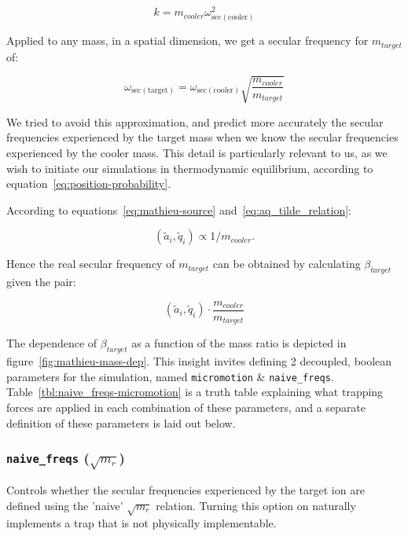 \begin{equation}
k = m_{cooler} \omega_{\mathrm{sec(cooler)}}^2
\end{equation}

Applied to any mass, in a spatial dimension, we get a secular frequency for $m_{target}$ of:

\begin{equation}
    \omega_\mathrm{sec(target)} = \omega_\mathrm{sec(cooler)}\sqrt{\frac{m_{cooler}}{m_{target}}} 
\end{equation}

We tried to avoid this approximation, and predict more accurately the secular frequencies experienced by the target mass when we know the secular frequencies experienced by the cooler mass. This detail is particularly relevant to us, as we wish to initiate our simulations in thermodynamic equilibrium, according to equation~\ref{eq:position-probability}.

According to equations~\ref{eq:mathieu-source} and~\ref{eq:aq_tilde_relation}:

\begin{equation}
(\tilde{a}_i,\tilde{q}_i) \propto 1/m_{cooler}.
\end{equation}

Hence the real secular frequency of $m_{target}$ can be obtained by calculating $\beta_{target}$ given the pair:

\begin{equation}
(\tilde{a}_i,\tilde{q}_i)\cdot \frac{m_{cooler}}{m_{target}}
\end{equation}

The dependence of $\beta_{target}$ as a function of the mass ratio is depicted in figure~\ref{fig:mathieu-mass-dep}. This insight invites defining 2 decoupled, boolean parameters for the simulation, named \texttt{micromotion} \& \texttt{naive\_freqs}. Table~\ref{tbl:naive_freqs-micromotion} is a truth table explaining what trapping forces are applied in each combination of these parameters, and a separate definition of these parameters is laid out below.

\subsubsection*{\texttt{naive\_freqs} ($\sqrt{m_r}$)}

Controls whether the secular frequencies experienced by the target  ion are defined using the 'naive' $\sqrt{m_r}$ relation. Turning this option on naturally implements a trap that is not physically implementable.


